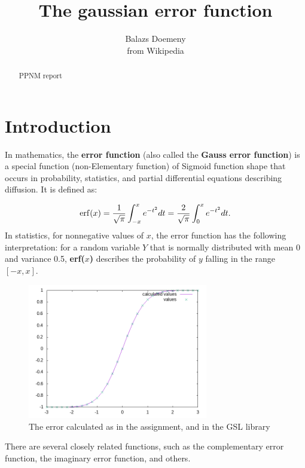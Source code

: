\documentclass{article}
\begin{document}
\title{The gaussian error function}
\author{Balazs Doemeny \\ from Wikipedia}
\date{}
\maketitle

\begin{abstract}
\centering
PPNM report
\end{abstract}

\section{Introduction}
In mathematics, the \textbf{error function} (also called the \textbf{Gauss error function}) is a special function (non-Elementary function) of Sigmoid function shape that occurs in probability, statistics, and partial differential equations describing diffusion. It is defined as:


$$
\mathrm{erf}(x)  = \frac{1}{\sqrt{\pi}}\int_{-x}^x e^{-t^2} dt \\
   = \frac{2}{\sqrt{\pi}}\int_0^x e^{-t^2} dt.
$$
In statistics, for nonnegative values of $x$, the error function has the following interpretation: for a random variable $Y$ that is normally distributed with mean 0 and variance 0.5, \textbf{erf($x$)} describes the probability of $y$ falling in the range $[-x,x]$.

\begin{figure}[]
\centering
\includegraphics[width=0.7\textwidth]{error_plot.png}
\caption{The error calculated as in the assignment, and in the GSL library}
\end{figure}


There are several closely related functions, such as the complementary error function, the imaginary error function, and others.
\end{document}
